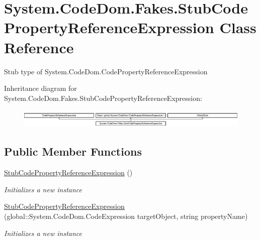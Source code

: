 \hypertarget{class_system_1_1_code_dom_1_1_fakes_1_1_stub_code_property_reference_expression}{\section{System.\-Code\-Dom.\-Fakes.\-Stub\-Code\-Property\-Reference\-Expression Class Reference}
\label{class_system_1_1_code_dom_1_1_fakes_1_1_stub_code_property_reference_expression}
}


Stub type of System.\-Code\-Dom.\-Code\-Property\-Reference\-Expression 


Inheritance diagram for System.\-Code\-Dom.\-Fakes.\-Stub\-Code\-Property\-Reference\-Expression\-:\begin{figure}[H]
\begin{center}
\leavevmode
\includegraphics[height=0.903955cm]{class_system_1_1_code_dom_1_1_fakes_1_1_stub_code_property_reference_expression}
\end{center}
\end{figure}
\subsection*{Public Member Functions}
\begin{DoxyCompactItemize}
\item 
\hyperlink{class_system_1_1_code_dom_1_1_fakes_1_1_stub_code_property_reference_expression_ad7ac202b36023a00e2433e061bf2c520}{Stub\-Code\-Property\-Reference\-Expression} ()
\begin{DoxyCompactList}\small\item\em Initializes a new instance\end{DoxyCompactList}\item 
\hyperlink{class_system_1_1_code_dom_1_1_fakes_1_1_stub_code_property_reference_expression_af7baffb12199d88ce1377de2d9818281}{Stub\-Code\-Property\-Reference\-Expression} (global\-::\-System.\-Code\-Dom.\-Code\-Expression target\-Object, string property\-Name)
\begin{DoxyCompactList}\small\item\em Initializes a new instance\end{DoxyCompactList}\end{DoxyCompactItemize}
